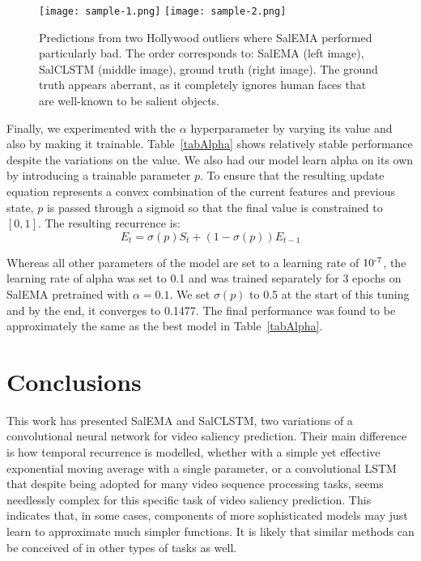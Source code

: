 \documentclass{bmvc2k}
\begin{document}
\begin{figure}[t]
\begin{center}
\texttt{[image: sample-1.png]}
\texttt{[image: sample-2.png]}
\end{center}
\caption{Predictions from two Hollywood outliers where SalEMA performed particularly bad. The order corresponds to: SalEMA (left image), SalCLSTM (middle image), ground truth (right image). The ground truth appears aberrant, as it completely ignores human faces that are well-known to be salient objects.} 
\label{figHollywoodQ}
\end{figure}


Finally, we experimented with the $\alpha$ hyperparameter by varying its value and also by making it trainable. Table~\ref{tabAlpha} shows relatively stable performance despite the variations on the value. We also had our model learn alpha on its own by introducing a trainable parameter $p$. To ensure that the resulting update equation represents a convex combination of the current features and previous state, $p$  is passed through a sigmoid so that the final value is constrained to $[0,1]$. The resulting recurrence is:
\begin{equation}
E_t = \sigma(p) S_t + (1-\sigma(p))E_{t-1} 
\end{equation}

Whereas all other parameters of the model are set to a learning rate of $10\textsuperscript{-7}$, the learning rate of alpha was set to 0.1 and was trained separately for 3 epochs on SalEMA pretrained with $\alpha=0.1$. We set $\sigma(p)$ to 0.5 at the start of this tuning and by the end, it converges to 0.1477. The final performance was found to be approximately the same as the best model in Table~\ref{tabAlpha}.




\section{Conclusions}

This work has presented SalEMA and SalCLSTM, two variations of a convolutional neural network for video saliency prediction. 
Their main difference is how temporal recurrence is modelled, whether with a simple yet effective exponential moving average with a single parameter, or a convolutional LSTM that despite being adopted for many video sequence processing tasks, seems needlessly complex for this specific task of video saliency prediction. This indicates that, in some cases, components of more sophisticated models may just learn to approximate much simpler functions. It is likely that similar methods can be conceived of in other types of tasks as well.
\end{document}
